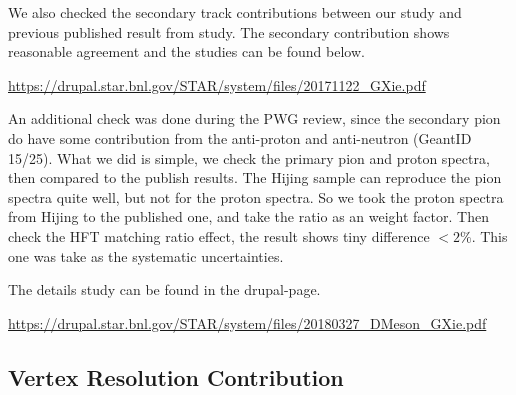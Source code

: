 We also checked the secondary track contributions between our study and previous published result from study. The secondary contribution shows reasonable agreement and the studies can be found below.

\url{https://drupal.star.bnl.gov/STAR/system/files/20171122_GXie.pdf}

An additional check was done during the PWG review, since the secondary pion do have some contribution from the anti-proton and anti-neutron (GeantID 15/25). What we did is simple, we check the primary pion and proton spectra, then compared to the publish results. The Hijing sample can reproduce the pion spectra quite well, but not for the proton spectra. So we took the proton spectra from Hijing to the published one, and take the ratio as an weight factor. Then check the HFT matching ratio effect, the result shows tiny difference $< 2\%$. This one was take as the systematic uncertainties.

The details study can be found in the drupal-page.

\url{https://drupal.star.bnl.gov/STAR/system/files/20180327_DMeson_GXie.pdf}

\subsection{Vertex Resolution Contribution}
\label{concern2}

